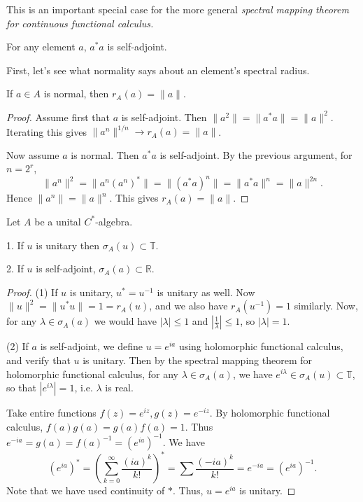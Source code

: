This is an important special case for the more general \textit{spectral mapping theorem for continuous functional calculus.}




\begin{remark}
	For any element $a$, $a^* a$ is self-adjoint.
\end{remark}

First, let's see what normality says about an element's spectral radius.

\begin{proposition}
	\label{prop:NormalSpectralRadius}
	If $a \in A$ is normal, then $r_A(a) = \|a\|$.
\end{proposition}
\begin{proof}
	Assume first that $a$ is self-adjoint. Then $\|a^2\| = \|a^* a\| = \|a\|^2$. Iterating this gives $\|a^n\|^{1 / n} \to r_A(a) = \|a\|$.

	Now assume $a$ is normal. Then $a^* a$ is self-adjoint. By the previous argument, for $n = 2^r$,
	\[
		\|a^n\|^2 = \|a^n (a^n)^*\| = \|(a^* a)^n\| = \|a^* a\|^n = \|a\|^{2 n}
	.\] 
	Hence $\|a^n\| = \|a\|^n$. This gives $r_A(a) = \|a\|$.
\end{proof}

\begin{proposition}
	\label{prop:UnitSASpec}
	Let $A$ be a unital $C^*$-algebra.
	
	1. If $u$ is unitary then $\sigma_A(u) \subset \mathbb{T}$.
	
	2. If $u$ is self-adjoint, $\sigma_A(a) \subset \mathbb{R}$.
\end{proposition}
\begin{proof}
	(1) If $u$ is unitary, $u^* = u^{-1}$ is unitary as well. Now $\|u\|^2 = \|u^* u\| = 1 = r_A(u)$, and we also have $r_A(u^{-1}) = 1$ similarly. Now, for any $\lambda \in \sigma_A(a)$ we would have $|\lambda| \le 1$ and $|\frac{1}{\lambda}| \le 1$, so $|\lambda| = 1$.

	(2) If $a$ is self-adjoint, we define $u = e^{i a}$ using holomorphic functional calculus, and verify that $u$ is unitary. Then by the spectral mapping theorem for holomorphic functional calculus, for any $\lambda \in \sigma_A(a)$, we have $e^{i \lambda} \in \sigma_A(u) \subset \mathbb{T}$, so that $|e^{i \lambda}| = 1$, i.e. $\lambda $ is real.

	Take entire functions $f(z) = e^{i z}, g(z) = e^{- i z}$. By holomorphic functional calculus, $f(a) g(a) = g(a) f(a) = 1$. Thus $e^{- i a} = g(a) = f(a)^{-1} = (e^{i a})^{-1}$. We have
	\[
		(e^{i a})^* = \left( \sum_{k = 0}^\infty \frac{(i a)^k}{k!} \right) ^* = \sum \frac{(- i a)^k}{k!} = e^{- i a} = (e^{i a})^{-1}
	.\] 
	Note that we have used continuity of $*$. Thus, $u = e^{ia}$ is unitary.
\end{proof}

